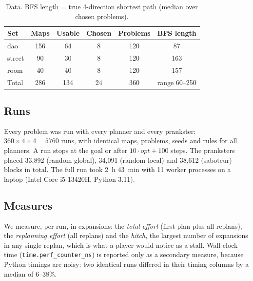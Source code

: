 \documentclass[conference,12pt]{IEEEtran}
\begin{document}
\begin{table}[!t]
\centering
\footnotesize
\caption{Data. BFS length = true 4-direction shortest path (median over chosen problems).}
\label{tab:data}
\begin{tabular}{lccccc}
\toprule
Set & Maps & Usable & Chosen & Problems & BFS length \\
\midrule
dao & 156 & 64 & 8 & 120 & 87 \\
street & 90 & 30 & 8 & 120 & 163 \\
room & 40 & 40 & 8 & 120 & 157 \\
\midrule
Total & 286 & 134 & 24 & 360 & range 60--250 \\
\bottomrule
\end{tabular}
\end{table}

\subsection{Runs}
Every problem was run with every planner and every prankster: $360\times4\times4=5760$ runs,
with identical maps, problems, seeds and rules for all planners. A run stops at the goal or
after $10\cdot\mathit{opt}+100$ steps. The pranksters placed 33{,}892 (random global),
34{,}091 (random local) and 38{,}612 (saboteur) blocks in total. The full run took 2~h 43~min
with 11 worker processes on a laptop (Intel Core i5-13420H, Python 3.11).

\subsection{Measures}
We measure, per run, in expansions: the \emph{total effort} (first plan plus all replans), the
\emph{replanning effort} (all replans) and the \emph{hitch}, the largest number of expansions in
any single replan, which is what a player would notice as a stall. Wall-clock time
(\texttt{time.perf\_counter\_ns}) is reported only as a secondary measure, because Python
timings are noisy: two identical runs differed in their timing columns by a median of 6--38\%.
\end{document}

